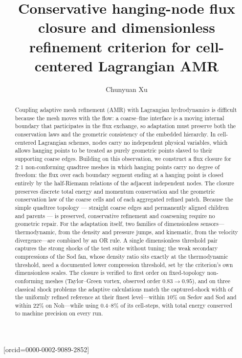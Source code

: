 \documentclass[a4paper]{cas-sc}
\begin{document}
\let\WriteBookmarks\relax



\title[mode = title]{Conservative hanging-node flux closure and dimensionless refinement criterion
for cell-centered Lagrangian AMR}

\author[1]{Chunyuan Xu}[orcid=0000-0002-9089-2852]

\cormark[1]




\begin{abstract}
Coupling adaptive mesh refinement (AMR) with Lagrangian hydrodynamics is difficult because the mesh moves with the flow: a coarse--fine interface is a moving internal boundary that participates in the flux exchange, so adaptation must preserve both the conservation laws and the geometric consistency of the embedded hierarchy. In cell-centered Lagrangian schemes, nodes carry no independent physical variables, which allows hanging points to be treated as purely geometric points slaved to their supporting coarse edges. Building on this observation, we construct a flux closure for $2\!:\!1$ non-conforming quadtree meshes in which hanging points carry no degree of freedom: the flux over each boundary segment ending at a hanging point is closed entirely by the half-Riemann relations of the adjacent independent nodes. The closure preserves discrete total energy and momentum conservation and the geometric conservation law of the coarse cells and of each aggregated refined patch. Because the simple quadtree topology --- straight coarse edges and permanently aligned children and parents --- is preserved, conservative refinement and coarsening require no geometric repair. For the adaptation itself, two families of dimensionless sensors---thermodynamic, from the density and pressure jumps, and kinematic, from the velocity divergence---are combined by an OR rule. A single dimensionless threshold pair captures the strong shocks of the test suite without tuning; the weak secondary compressions of the Sod fan, whose density ratio sits exactly at the thermodynamic threshold, need a documented lower compression threshold, set by the criterion's own dimensionless scales. The closure is verified to first order on fixed-topology non-conforming meshes (Taylor--Green vortex, observed order $0.83\to0.95$), and on three classical shock problems the adaptive calculations match the captured-shock width of the uniformly refined reference at their finest level---within $10\%$ on Sedov and Sod and within $22\%$ on Noh---while using $0.4$--$8\%$ of its cell-steps, with total energy conserved to machine precision on every run.
\end{abstract}
\end{document}
